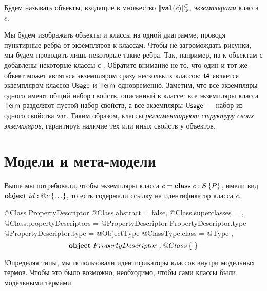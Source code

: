 \begin{Def}
Будем называть объекты, входящие в множество $[\![\mathbf{val}\left(c\right)]\!]_\Psi^C$, \emph{экземплярами} класса $c$.
\end{Def}

Мы будем изображать объекты и классы на одной диаграмме, проводя пунктирные ребра от экземпляров к классам. Чтобы не загромождать рисунки, мы будем проводить лишь некоторые такие ребра. Так, например, на  к объектам с  добавлены некоторые классы с .
%
%
%
Обратите внимание не то, что один и тот же объект может являться экземпляром сразу нескольких классов: $\mathsf{t4}$ является экземпляром классов $\mathsf{Usage}$ и $\mathsf{Term}$ одновременно. Заметим, что все экземпляры одного имеют общий набор свойств, описанный в классе: все экземпляры класса $\mathsf{Term}$ разделяют пустой набор свойств, а все экземпляры $\mathsf{Usage}$ --- набор из одного свойства $\mathsf{var}$. Таким образом, классы \emph{регламентируют структуру своих экземпляров}, гарантируя наличие тех или иных свойств у объектов.

\section{Модели и мета-модели}

Выше мы потребовали, чтобы экземпляры класса $c = \mathbf{class}\;c : S \left\{P\right\}$, имели вид $\mathbf{object}\;id : @c\left\{ \ldots \right\}$, то есть содержали ссылку на идентификатор класса $c$.

  @Class PropertyDescriptor {
    @Class.abstract = false,
    @Class.superclasses = {},
    @Class.propertyDescriptors = {
      @PropertyDescriptor PropertyDescriptor.type {
        @PropertyDescriptor.type = @ObjectType { @ClassType.class = @Type }
      }
    }
  },
$$
\mathbf{object}\;PropertyDescriptor : @Class\left\{ \mbox{
} \right\}
$$

!Определяя типы, мы использовали идентификаторы классов внутри модельных термов. Чтобы это было возможно, необходимо, чтобы сами классы были модельными термами.

